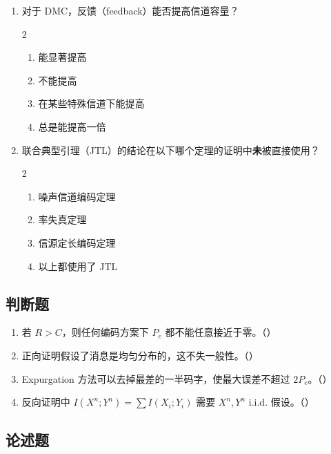 \documentclass[12pt,a4paper]{ctexart}
\begin{document}
\begin{enumerate}[label=\arabic*., leftmargin=*]
\item 对于 DMC，反馈（feedback）能否提高信道容量？
\begin{multicols}{2}
\begin{enumerate}[label=(\Alph*)]
  \item 能显著提高
  \item 不能提高
  \item 在某些特殊信道下能提高
  \item 总是能提高一倍
\end{enumerate}
\end{multicols}

\item 联合典型引理（JTL）的结论在以下哪个定理的证明中\textbf{未}被直接使用？
\begin{multicols}{2}
\begin{enumerate}[label=(\Alph*)]
  \item 噪声信道编码定理
  \item 率失真定理
  \item 信源定长编码定理
  \item 以上都使用了 JTL
\end{enumerate}
\end{multicols}

\end{enumerate}

\subsection*{判断题}

\begin{enumerate}[label=\arabic*., leftmargin=*]
\item 若 $R > C$，则任何编码方案下 $P_e$ 都不能任意接近于零。（\quad）
\item 正向证明假设了消息是均匀分布的，这不失一般性。（\quad）
\item Expurgation 方法可以去掉最差的一半码字，使最大误差不超过 $2P_e$。（\quad）
\item 反向证明中 $I(X^n;Y^n) = \sum I(X_i;Y_i)$ 需要 $X^n,Y^n$ i.i.d. 假设。（\quad）
\end{enumerate}

\subsection*{论述题}
\end{document}
